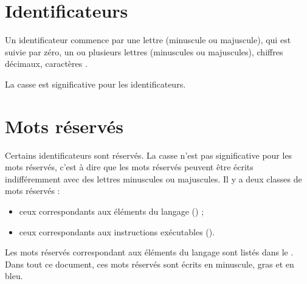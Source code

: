 \section{Identificateurs}
Un identificateur commence par une lettre (minuscule ou majuscule), qui est suivie par zéro, un ou plusieurs lettres (minuscules ou majuscules), chiffres décimaux, caractères \piccolo{\_}.

La casse est significative pour les identificateurs.

\section{Mots réservés}

Certains identificateurs sont réservés. La casse n’est pas significative pour les mots réservés, c’est à dire que les mots réservés peuvent être écrits indifféremment avec des lettres minuscules ou majuscules. Il y a deux classes de mots réservés :
\begin{itemize}
  \item ceux correspondants aux éléments du langage () ;
  \item ceux correspondants aux instructions exécutables ().
\end{itemize}


Les mots réservés correspondant aux éléments du langage sont listés dans le . Dans tout ce document, ces mots réservés sont écrits en minuscule, gras et en bleu.


\newcommand\keyWordLanguage[1]{\textcolor{blue}{\bf#1}}

